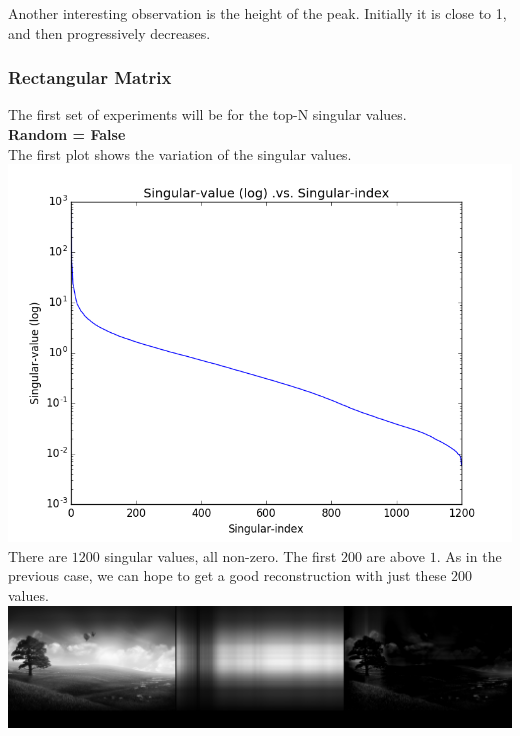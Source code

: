 \documentclass{article}
\begin{document}
Another interesting observation is the height of the peak. Initially it is close to 1, and then progressively decreases. 

\newpage
\subsubsection{Rectangular Matrix}

The first set of experiments will be for the top-N singular values.\\

\textbf{Random = False}\\

The first plot shows the variation of the singular values.\\

\includegraphics[width =\textwidth]{SVD/a/Rect/False/singular.png}\\

There are $1200$ singular values, all non-zero. The first $200$ are above $1$. As in the previous case, we can hope to get a good reconstruction with just these $200$ values.\\

\includegraphics[width =\textwidth]{SVD/a/Rect/False/recon0001.png}\\
\end{document}
